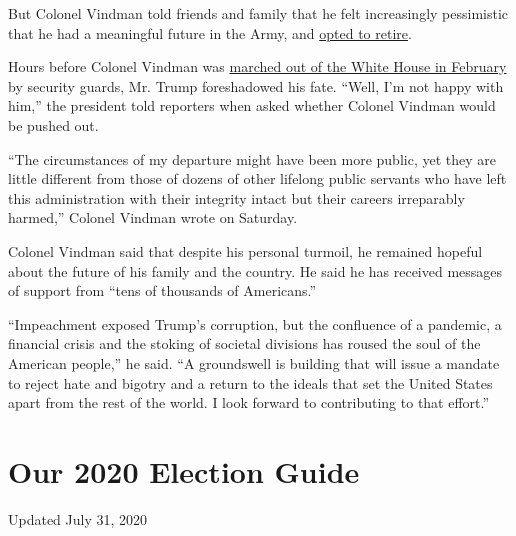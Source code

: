 But Colonel Vindman told friends and family that he felt increasingly
pessimistic that he had a meaningful future in the Army, and
\href{https://www.nytimes.com/2020/07/08/us/politics/vindman-trump-ukraine-impeachment.html}{opted
to retire}.

Hours before Colonel Vindman was
\href{https://www.nytimes.com/2020/02/07/us/politics/alexander-vindman-gordon-sondland-fired.html}{marched
out of the White House in February} by security guards, Mr. Trump
foreshadowed his fate. ``Well, I'm not happy with him,'' the president
told reporters when asked whether Colonel Vindman would be pushed out.

``The circumstances of my departure might have been more public, yet
they are little different from those of dozens of other lifelong public
servants who have left this administration with their integrity intact
but their careers irreparably harmed,'' Colonel Vindman wrote on
Saturday.

Colonel Vindman said that despite his personal turmoil, he remained
hopeful about the future of his family and the country. He said he has
received messages of support from ``tens of thousands of Americans.''

``Impeachment exposed Trump's corruption, but the confluence of a
pandemic, a financial crisis and the stoking of societal divisions has
roused the soul of the American people,'' he said. ``A groundswell is
building that will issue a mandate to reject hate and bigotry and a
return to the ideals that set the United States apart from the rest of
the world. I look forward to contributing to that effort.''

\hypertarget{our-2020-election-guide}{%
\section{Our 2020 Election Guide}\label{our-2020-election-guide}}

Updated July 31, 2020

